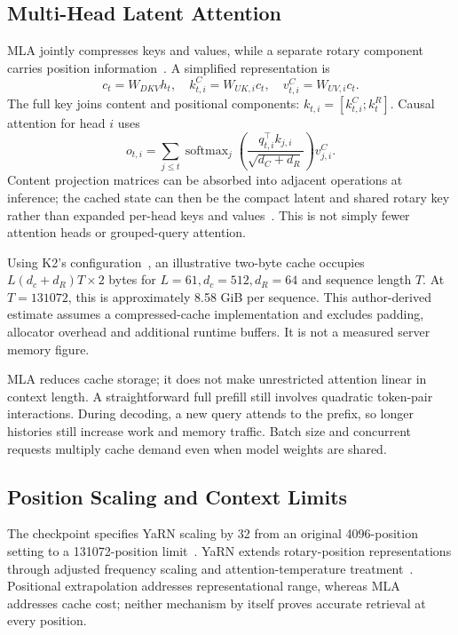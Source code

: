 \documentclass[conference]{IEEEtran}
\begin{document}
\subsection{Multi-Head Latent Attention}
MLA jointly compresses keys and values, while a separate rotary component carries position information~\cite{v2}. A simplified representation is
\begin{equation}
c_t=W_{DKV}h_t,\quad k_{t,i}^{C}=W_{UK,i}c_t,\quad
v_{t,i}^{C}=W_{UV,i}c_t.
\end{equation}
The full key joins content and positional components: $k_{t,i}=[k_{t,i}^{C};k_t^R]$. Causal attention for head $i$ uses
\begin{equation}
o_{t,i}=\sum_{j\leq t}
\operatorname{softmax}_j\!\left(\frac{q_{t,i}^{\top}k_{j,i}}
{\sqrt{d_C+d_R}}\right)v_{j,i}^{C}.
\end{equation}
Content projection matrices can be absorbed into adjacent operations at inference; the cached state can then be the compact latent and shared rotary key rather than expanded per-head keys and values~\cite{v2}. This is not simply fewer attention heads or grouped-query attention.

Using K2's configuration~\cite{config}, an illustrative two-byte cache occupies $L(d_c+d_R)T\times2$ bytes for $L=61,d_c=512,d_R=64$ and sequence length $T$. At $T=131072$, this is approximately 8.58 GiB per sequence. This author-derived estimate assumes a compressed-cache implementation and excludes padding, allocator overhead and additional runtime buffers. It is not a measured server memory figure.

MLA reduces cache storage; it does not make unrestricted attention linear in context length. A straightforward full prefill still involves quadratic token-pair interactions. During decoding, a new query attends to the prefix, so longer histories still increase work and memory traffic. Batch size and concurrent requests multiply cache demand even when model weights are shared.

\subsection{Position Scaling and Context Limits}
The checkpoint specifies YaRN scaling by 32 from an original 4096-position setting to a 131072-position limit~\cite{config}. YaRN extends rotary-position representations through adjusted frequency scaling and attention-temperature treatment~\cite{yarn}. Positional extrapolation addresses representational range, whereas MLA addresses cache cost; neither mechanism by itself proves accurate retrieval at every position.
\end{document}
